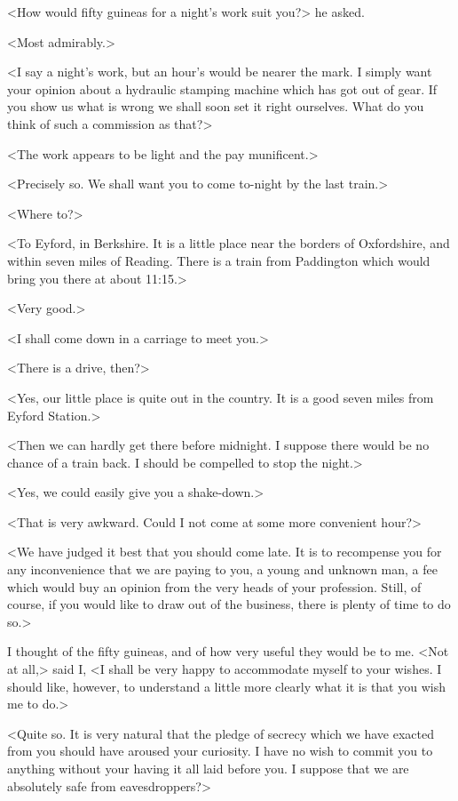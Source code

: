 <How would fifty guineas for a night's work suit you?> he asked.

<Most admirably.>

<I say a night's work, but an hour's would be nearer the mark. I simply want your opinion about a hydraulic stamping machine which has got out of gear. If you show us what is wrong we shall soon set it right ourselves. What do you think of such a commission as that?>

<The work appears to be light and the pay munificent.>

<Precisely so. We shall want you to come to-night by the last train.>

<Where to?>

<To Eyford, in Berkshire. It is a little place near the borders of Oxfordshire, and within seven miles of Reading. There is a train from Paddington which would bring you there at about 11:15.>

<Very good.>

<I shall come down in a carriage to meet you.>

<There is a drive, then?>

<Yes, our little place is quite out in the country. It is a good seven miles from Eyford Station.>

<Then we can hardly get there before midnight. I suppose there would be no chance of a train back. I should be compelled to stop the night.>

<Yes, we could easily give you a shake-down.>

<That is very awkward. Could I not come at some more convenient hour?>

<We have judged it best that you should come late. It is to recompense you for any inconvenience that we are paying to you, a young and unknown man, a fee which would buy an opinion from the very heads of your profession. Still, of course, if you would like to draw out of the business, there is plenty of time to do so.>

I thought of the fifty guineas, and of how very useful they would be to me. <Not at all,> said I, <I shall be very happy to accommodate myself to your wishes. I should like, however, to understand a little more clearly what it is that you wish me to do.>

<Quite so. It is very natural that the pledge of secrecy which we have exacted from you should have aroused your curiosity. I have no wish to commit you to anything without your having it all laid before you. I suppose that we are absolutely safe from eavesdroppers?>

